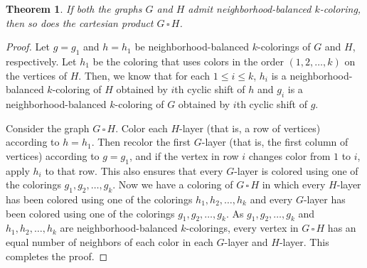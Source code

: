 \documentclass[12pt]{article}
\newtheorem{theorem}{Theorem}[section]
\newcommand{\nbc}{neighborhood-balanced $k$-coloring\xspace}
\newcommand{\nbcs}{neighborhood-balanced $k$-colorings\xspace}
\begin{document}

\begin{theorem} \label{th:cartesian}
    If both the graphs $G$ and $H$ admit \nbc, then so does the cartesian product $G\, \square\, H$. 
\end{theorem}
\begin{proof}
    Let $g=g_1$ and $h=h_1$ be \nbcs of $G$ and $H$, respectively.
    Let $h_1$ be the coloring that uses colors in the order $(1, 2, \dots, k)$ on the vertices of $H$.
    Then, we know that for each $1 \le i \le k$, $h_i$ is a \nbc of $H$ obtained by $i$th cyclic shift of $h$ and $g_i$ is a \nbc of $G$ obtained by $i$th cyclic shift of $g$.
    
    Consider the graph $G\, \square\, H$.
    Color each $H$-layer (that is, a row of vertices) according to $h=h_1$.
    Then recolor the first $G$-layer (that is, the first column of vertices) according to $g=g_1$, and if the vertex in row $i$ changes color from $1$ to $i$, apply $h_i$ to that row.
    This also ensures that every $G$-layer is colored using one of the colorings $g_1, g_2, \dots, g_{k}$.
    Now we have a coloring of $G\, \square\, H$ in which every $H$-layer has been colored using one of the colorings $h_1, h_2, \dots, h_{k}$ and every $G$-layer has been colored using one of the colorings $g_1, g_2, \dots, g_{k}$.
    As $g_1, g_2, \dots, g_{k}$ and $h_1, h_2, \dots, h_{k}$ are \nbcs, every vertex in $G\, \square\, H$ has an equal number of neighbors of each color in each $G$-layer and $H$-layer.
    This completes the proof.
\end{proof}
\end{document}
